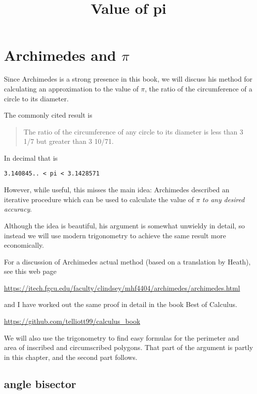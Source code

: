 \documentclass[11pt, oneside]{article}
\title{Value of pi}
\date{}
\begin{document}
\maketitle
\Large

\label{sec:Value_of_pi}

\section*{Archimedes and $\pi$}
Since Archimedes is a strong presence in this book, we will discuss his method for calculating an approximation to the value of $\pi$, the ratio of the circumference of a circle to its diameter.  

The commonly cited result is 

\begin{quote}The ratio of the circumference of any circle to its diameter is less than 3 1/7 but greater than 3 10/71.\end{quote}

In decimal that is

\begin{verbatim}
3.140845.. < pi < 3.1428571
\end{verbatim}

However, while useful, this misses the main idea:  Archimedes described an iterative procedure which can be used to calculate the value of $\pi$ \emph{to any desired accuracy}.

Although the idea is beautiful, his argument is somewhat unwieldy in detail, so instead we will use modern trigonometry to achieve the same result more economically.  

For a discussion of Archimedes actual method (based on a translation by Heath), see this web page

\url{https://itech.fgcu.edu/faculty/clindsey/mhf4404/archimedes/archimedes.html}

and I have worked out the same proof in detail in the book Best of Calculus.

\url{https://github.com/telliott99/calculus_book}

We will also use the trigonometry to find easy formulas for the perimeter and area of inscribed and circumscribed polygons.  That part of the argument is partly in this chapter, and the second part follows.

\subsection*{angle bisector}
\end{document}
